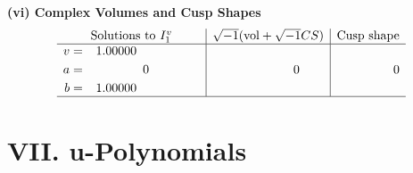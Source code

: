 \documentclass[1p]{elsarticle_modified}
\theoremstyle{definition}
\newcommand{\I}{\sqrt{-1}}
\begin{document}
\newpage\flushleft \textbf{(vi) Complex Volumes and Cusp Shapes}
$$\begin{array}{c|c|c}  
\text{Solutions to }I^v_{1}& \I (\text{vol} + \sqrt{-1}CS) & \text{Cusp shape}\\
 \hline 
\begin{aligned}
v &= \phantom{-}1.00000\phantom{ +0.000000I} \\
a &= \phantom{-0.000000 } 0 \\
b &= \phantom{-}1.00000\phantom{ +0.000000I}\end{aligned}
 & \phantom{-0.000000 } 0 & \phantom{-0.000000 } 0\\
 \hline 
 \end{array}$$\newpage
\newpage\renewcommand{\arraystretch}{1}
\centering \section*{ VII. u-Polynomials}
\end{document}
